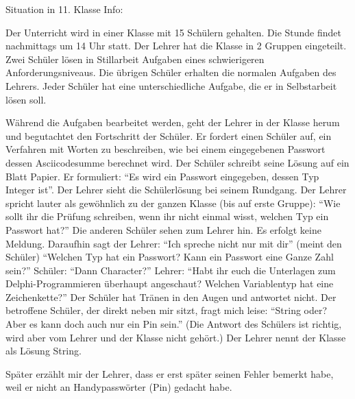 \documentclass[12pt]{scrartcl}
\begin{document}
Situation in 11. Klasse Info:

Der Unterricht wird in einer Klasse mit 15 Schülern gehalten. Die Stunde findet nachmittags um 14 Uhr statt. Der Lehrer hat die Klasse in 2 Gruppen eingeteilt. Zwei Schüler lösen in Stillarbeit Aufgaben eines schwierigeren Anforderungsniveaus. Die übrigen Schüler erhalten die normalen Aufgaben des Lehrers. Jeder Schüler hat eine unterschiedliche Aufgabe, die er in Selbstarbeit lösen soll.

Während die Aufgaben bearbeitet werden, geht der Lehrer in der Klasse herum und begutachtet den Fortschritt der Schüler. Er fordert einen Schüler auf, ein Verfahren mit Worten zu beschreiben, wie bei einem eingegebenen Passwort dessen Asciicodesumme berechnet wird.
Der Schüler schreibt seine Lösung auf ein Blatt Papier. Er formuliert:  \enquote{Es wird ein Passwort eingegeben, dessen Typ Integer ist}.
Der Lehrer sieht die Schülerlösung bei seinem Rundgang.
Der Lehrer spricht lauter als gewöhnlich zu der ganzen Klasse (bis auf erste Gruppe): \enquote{Wie sollt ihr die Prüfung schreiben, wenn ihr nicht einmal wisst, welchen Typ ein Passwort hat?} Die anderen Schüler sehen zum Lehrer hin. Es erfolgt keine Meldung. Daraufhin sagt der Lehrer: \enquote{Ich spreche nicht nur mit dir} (meint den Schüler)
\enquote{Welchen Typ hat ein Passwort? Kann ein Passwort eine Ganze Zahl sein?} Schüler: \enquote{Dann Character?} Lehrer: \enquote{Habt ihr euch die Unterlagen zum Delphi-Programmieren überhaupt angeschaut? Welchen Variablentyp hat eine Zeichenkette?} Der Schüler hat Tränen in den Augen und antwortet nicht.
Der betroffene Schüler, der direkt neben mir sitzt, fragt mich leise: \enquote{String oder? Aber es kann doch auch nur ein Pin sein.} (Die Antwort des Schülers ist richtig, wird aber vom Lehrer und der Klasse nicht gehört.) Der Lehrer nennt der Klasse als Lösung String.

Später erzählt mir der Lehrer, dass er erst später seinen Fehler bemerkt habe, weil er nicht an Handypasswörter (Pin) gedacht habe.
\end{document}
